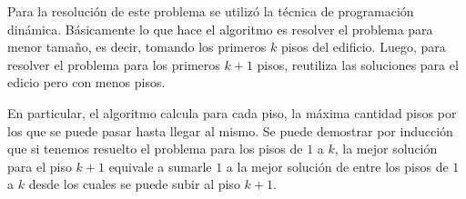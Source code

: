 
Para la resolución de este problema se utilizó la técnica de programación dinámica.
Básicamente lo que hace el algoritmo es resolver el problema para menor tamaño, es decir, tomando los primeros $k$ pisos del edificio. Luego, para resolver el problema para los primeros $k+1$ pisos, reutiliza las soluciones para el edicio pero con menos pisos.

En particular, el algoritmo calcula para cada piso, la máxima cantidad pisos por los que se puede pasar hasta llegar al mismo. Se puede demostrar por inducción que si tenemos resuelto el problema para los pisos de $1$ a $k$, la mejor solución para el piso $k+1$ equivale a sumarle $1$ a la mejor solución de entre los pisos de $1$ a $k$ desde los cuales se puede subir al piso $k+1$.



